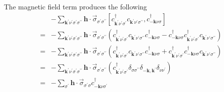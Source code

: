 The magnetic field term produces the following
\begin{eqnarray}
& & -\sum_{\mathbf{k}^{\prime}\nu^{\prime}\sigma^{\prime}\sigma^{\prime\prime}}
\mathbf{h}\cdot \vec{\sigma}_{\sigma^{\prime}\sigma^{\prime\prime}}
\left[c^{\dagger}_{\mathbf{k}^{\prime}\nu^{\prime}\sigma^{\prime}}
c_{\mathbf{k}^{\prime}\nu^{\prime}\sigma^{\prime\prime}},
c^{\dagger}_{-\mathbf{k}\nu\sigma}\right] \\
& = &  -\sum_{\mathbf{k}^{\prime}\nu^{\prime}\sigma^{\prime}\sigma^{\prime\prime}}
\mathbf{h}\cdot \vec{\sigma}_{\sigma^{\prime}\sigma^{\prime\prime}}
\left( c^{\dagger}_{\mathbf{k}^{\prime}\nu^{\prime}\sigma^{\prime}}
c_{\mathbf{k}^{\prime}\nu^{\prime}\sigma^{\prime\prime}}
c^{\dagger}_{-\mathbf{k}\nu\sigma} -
c^{\dagger}_{-\mathbf{k}\nu\sigma}
c^{\dagger}_{\mathbf{k}^{\prime}\nu^{\prime}\sigma^{\prime}}
c_{\mathbf{k}^{\prime}\nu^{\prime}\sigma^{\prime\prime}} \right) \\
& = & -\sum_{\mathbf{k}^{\prime}\nu^{\prime}\sigma^{\prime}\sigma^{\prime\prime}}
\mathbf{h}\cdot \vec{\sigma}_{\sigma^{\prime}\sigma^{\prime\prime}}
\left( c^{\dagger}_{\mathbf{k}^{\prime}\nu^{\prime}\sigma^{\prime}}
c_{\mathbf{k}^{\prime}\nu^{\prime}\sigma^{\prime\prime}}
c^{\dagger}_{-\mathbf{k}\nu\sigma} + 
c^{\dagger}_{\mathbf{k}^{\prime}\nu^{\prime}\sigma^{\prime}}
c^{\dagger}_{-\mathbf{k}\nu\sigma}
c_{\mathbf{k}^{\prime}\nu^{\prime}\sigma^{\prime\prime}} \right) \\
& = & -\sum_{\mathbf{k}^{\prime}\nu^{\prime}\sigma^{\prime}\sigma^{\prime\prime}}
\mathbf{h}\cdot \vec{\sigma}_{\sigma^{\prime}\sigma^{\prime\prime}}
\left( c^{\dagger}_{\mathbf{k}^{\prime}\nu^{\prime}\sigma^{\prime}}
\delta_{\sigma\sigma^{\prime\prime}} \delta_{-\mathbf{k},
\mathbf{k}^{\prime}}\delta_{\nu\nu^{\prime}} \right) \\
& = & - \sum_{\sigma^{\prime}} \mathbf{h}\cdot
\vec{\sigma}_{\sigma^{\prime}\sigma}
c^{\dagger}_{-\mathbf{k}\nu\sigma^{\prime}}
\end{eqnarray}

